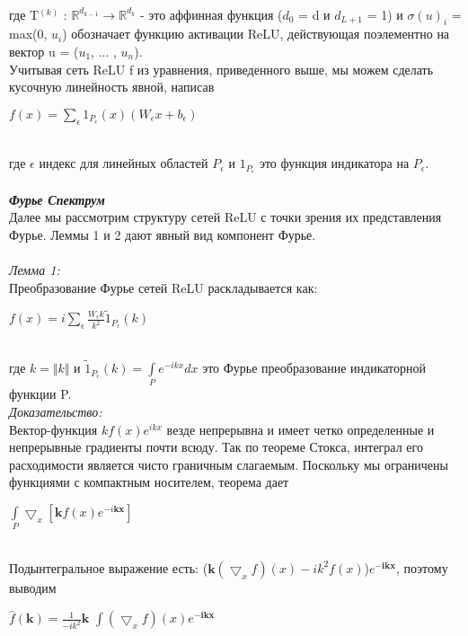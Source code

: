 \documentclass{article}
\begin{document}
    \\
    где T$^{(k)}$ : ${\mathbb{R}}^{d_{k-1}} \rightarrow {\mathbb{R}^{d_{k}}}$ - это аффинная функция ($d_0$ = d и $d_{L + 1}$ = 1) и $\sigma(u)_i$ = max(0, $u_i$) обозначает функцию активации ReLU, действующая поэлементно на вектор u = ($u_1$, ... , $u_n$).
    \\ 
    Учитывая сеть ReLU f из уравнения, приведенного выше, мы можем сделать кусочную линейность явной, написав
    \begin{center} 
    $f(x)= \sum\limits_{\epsilon} 1_{P_{\epsilon}}(x) (W_{\epsilon}x + b_{\epsilon})$
    \end{center}
    \\
    где ${\epsilon}$ индекс для линейных областей $P_{\epsilon}$ и $1_{P_{\epsilon}}$ это функция индикатора на $P_{\epsilon}$.
    \\ \\
    \textbf {\textit{Фурье Спектрум}}
    \\
    Далее мы рассмотрим структуру сетей ReLU с точки зрения их представления Фурье. Леммы 1 и 2 дают явный вид компонент Фурье.
    \\ \\
    \textit{Лемма 1:}
    \\
    Преобразование Фурье сетей ReLU раскладывается как:
    \\
    \begin{center} 
    $f(x)= i \sum\limits_{\epsilon} \frac{W_{\epsilon}k}{k^2} \tilde{1}_{P_{\epsilon}}(k) $
    \end{center}
    \\
    где $k = \Vert k \Vert$ и $\tilde{1}_{P_{\epsilon}}(k) = \int\limits_{P} e^{-ikx}dx$ это Фурье преобразование индикаторной функции P.
    \\
    \textit{Доказательство:}
    \\
    Вектор-функция
    $kf(x)e^{ikx}$ везде непрерывна и имеет четко определенные и непрерывные градиенты почти всюду. Так по теореме Стокса, интеграл его расходимости является чисто граничным слагаемым. Поскольку мы ограничены функциями с компактным носителем, теорема дает
    \begin{center}
    $\int\limits_{P} \bigtriangledown_{x} [ \textbf{k}f(x)e^{-i\textbf{kx}} ]$
    \end{center}
    \\ 
    Подынтегральное выражение есть: ($\textbf{k}(\bigtriangledown_{x}f)(x) - ik^{2}f(x)$)$e^{-\textbf{ikx}}$, поэтому выводим
    \begin{center}
    $\hat{f}(\textbf{k}) = \frac{1}{-ik^2}\textbf{k}$ $\int(\bigtriangledown_{x}f)(x)e^{-\textbf{ikx}}$
    \end{center}
\end{document}
